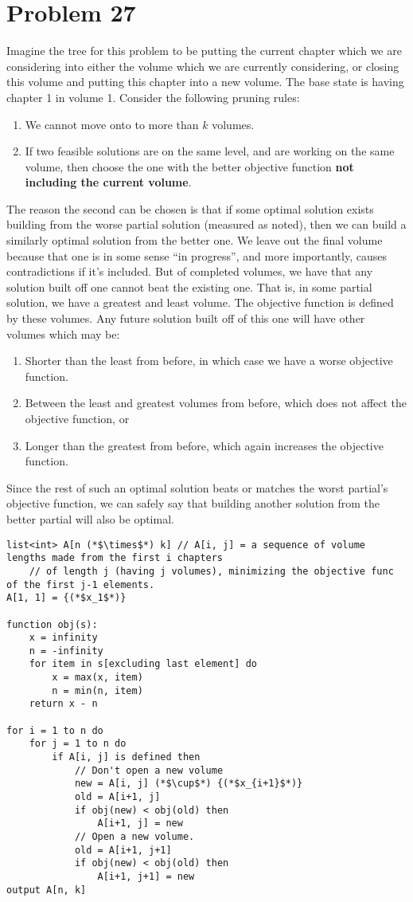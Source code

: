 \documentclass{article}
\providecommand{\prob}[1]{\section*{Problem #1}}
\begin{document}
\pagebreak
\prob{27}
Imagine the tree for this problem to be putting the current chapter which we are considering into either 
the volume which we are currently considering, or closing this volume and putting this chapter into a new volume.
The base state is having chapter 1 in volume 1.
Consider the following pruning rules:
\begin{enumerate}
    \item We cannot move onto to more than $k$ volumes.
    \item If two feasible solutions are on the same level, 
    and are working on the same volume, 
    then choose the one with the better objective function \textbf{not including the current volume}.
\end{enumerate}
The reason the second can be chosen is that if some 
optimal solution exists building from the worse partial solution (measured as noted),
then we can build a similarly optimal solution from the better one.
We leave out the final volume because that one is in some sense ``in progress'', and more importantly, causes contradictions if it's included.
But of completed volumes, we have that any solution built off one cannot beat the existing one.
That is, in some partial solution, we have a greatest and least volume.
The objective function is defined by these volumes.
Any future solution built off of this one will have other volumes which may be:
\begin{enumerate}
    \item Shorter than the least from before, in which case we have a worse objective function.
    \item Between the least and greatest volumes from before, which does not affect the objective function, or
    \item Longer than the greatest from before, which again increases the objective function.
\end{enumerate}

Since the rest of such an optimal solution beats or matches the worst partial's objective function, 
we can safely say that building another solution from the better partial will also be optimal.

\begin{lstlisting}
list<int> A[n (*$\times$*) k] // A[i, j] = a sequence of volume lengths made from the first i chapters
    // of length j (having j volumes), minimizing the objective func of the first j-1 elements.
A[1, 1] = {(*$x_1$*)}

function obj(s):
    x = infinity
    n = -infinity
    for item in s[excluding last element] do
        x = max(x, item)
        n = min(n, item)
    return x - n

for i = 1 to n do
    for j = 1 to n do
        if A[i, j] is defined then
            // Don't open a new volume
            new = A[i, j] (*$\cup$*) {(*$x_{i+1}$*)}
            old = A[i+1, j]
            if obj(new) < obj(old) then
                A[i+1, j] = new
            // Open a new volume.
            old = A[i+1, j+1]
            if obj(new) < obj(old) then
                A[i+1, j+1] = new
output A[n, k]
\end{lstlisting}
\end{document}
